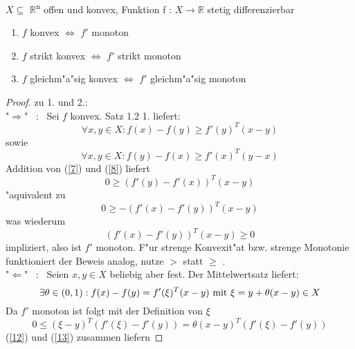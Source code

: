 	\begin{satz}
		$X\subseteq$ $\mathbb{R}$\textsuperscript{n} offen und konvex, Funktion f : $X\to\mathbb{R}$ stetig differenzierbar
		\begin{enumerate}
			\item $f$ konvex \( \Leftrightarrow \) $f'$ monoton
			\item $f$ strikt konvex \( \Leftrightarrow \) $f'$ strikt monoton
			\item $f$ gleichm"a"sig konvex \( \Leftrightarrow \) $f'$ gleichm"a"sig monoton
		\end{enumerate}
	\end{satz}
	\begin{proof}
		zu 1. und 2.: \\
		"\( \Rightarrow \)" \ : \ Sei $f$ konvex. Satz 1.2 1. liefert: \begin{equation} \label{7}
		\forall x,y \in X: f(x)-f(y) \geq f'(y)^T(x-y) \end{equation} sowie
		\begin{equation} \label{8}
		\forall x,y \in X: f(y)-f(x) \geq f'(x)^T(y-x)
		\end{equation}
		Addition von (\ref{7}) und (\ref{8}) liefert
		\begin{equation*} \label{9}
		0 \geq (f'(y)-f'(x))^T(x-y)
		\end{equation*}
		"aquivalent zu
		\begin{equation*} \label{10}
		0 \geq -(f'(x)-f'(y))^T(x-y)
		\end{equation*}
		was wiederum 
		\begin{equation*} \label{11}
		(f'(x)-f'(y))^T(x-y) \geq 0
		\end{equation*} impliziert, also ist $f'$ monoton.
		F"ur strenge Konvexit"at bzw. strenge Monotonie funktioniert der Beweis analog, nutze \(>\) statt  \( \geq \) . \\
		"\( \Leftarrow \)" \ : \ Seien $x,y \in X$ beliebig aber fest. Der Mittelwertsatz liefert:
		\begin{equation} \label{12}
		\exists \theta \in (0,1): f(x)-f(y)=f'(\xi)^T(x-y) \ \textnormal{mit} \ \xi =y+ \theta (x-y) \in X
		\end{equation}
		Da $f'$ monoton ist folgt mit der Definition von \( \xi\)
		\begin{equation} \label{13}
		0 \leq (\xi -y)^T(f'( \xi )-f'(y))=\theta (x-y)^T(f'(\xi)-f'(y))
		\end{equation}
		(\ref{12}) und (\ref{13}) zusammen liefern

\end{proof}
